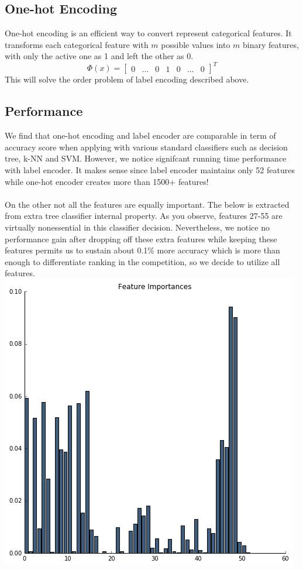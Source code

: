 \documentclass[conference]{IEEEtran}
\begin{document}
\subsection{One-hot Encoding}
One-hot encoding is an efficient way to convert represent categorical features. It transforms each categorical feature with $m$ possible values into $m$ binary features, with only the active one as 1 and left the other as 0. 
\begin{equation}
\Phi(x) = 
\begin{bmatrix}
    0 & \dots & 0 & 1 & 0 & \dots & 0
\end{bmatrix}^T
\end{equation}
\indent This will solve the order problem of label encoding described above. 
\subsection{Performance}
We find that one-hot encoding and label encoder are comparable in term of accuracy score when applying with various standard classifiers such as decision tree, k-NN and SVM. However, we notice signifcant running time performance with label encoder. It makes sense since label encoder maintains only 52 features while one-hot encoder creates more than 1500+ features! \\ \\
On the other not all the features are equally important. The below is extracted from extra tree classifier internal property. As you observe, features 27-55 are virtually nonessential in this classifier decision. Nevertheless, we notice no performance gain after dropping off these extra features while keeping these features permits us to sustain about 0.1\% more accuracy which is more than enough to differentiate ranking in the competition, so we decide to utilize all features. 
\\
\includegraphics[scale=0.45]{report1.png}
\end{document}
